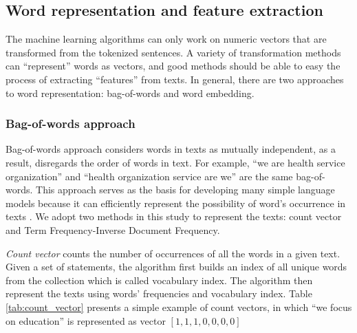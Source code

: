\documentclass[11pt]{article}
\begin{document}

\subsection{Word representation and feature extraction}

The machine learning algorithms can only work on numeric vectors that are transformed from the tokenized sentences. A variety of transformation methods can ``represent'' words as vectors, and good methods should be able to easy the process of extracting ``features'' from texts. In general, there are two approaches to word representation: bag-of-words and word embedding.

\subsubsection{Bag-of-words approach}

Bag-of-words approach considers words in texts as mutually independent, as a result, disregards the order of words in text. For example, ``we are health service organization'' and ``health organization service are we'' are the same bag-of-words. This approach serves as the basis for developing many simple language models because it can efficiently represent the possibility of word's occurrence in texts \parencite{BengfortAppliedTextAnalysis2018}. We adopt two methods in this study to represent the texts: count vector and Term Frequency-Inverse Document Frequency.

\textit{Count vector} counts the number of occurrences of all the words in a given text. Given a set of statements, the algorithm first builds an index of all unique words from the collection which is called vocabulary index. The algorithm then represent the texts using words' frequencies and vocabulary index. Table \ref{tab:count_vector} presents a simple example of count vectors, in which ``we focus on education'' is represented as vector $[1, 1, 1, 0, 0, 0, 0]$
\end{document}
